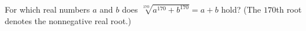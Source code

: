For which real numbers $a$ and $b$ does $\sqrt[170]{a^{170}+b^{170}}=a+b$ hold? (The $170$th root denotes the nonnegative real root.)
